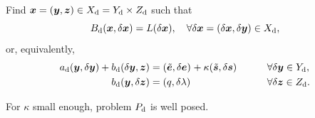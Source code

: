 \begin{problem}[$\Pd$] Find $\xF = (\yF,\zF)\in\XSd = \YSd\times\ZSd$ such that
\begin{equation}
\Bd(\xF,\delta\xF) = L(\delta\xF),\quad\forall\delta\xF = (\delta\xF,\delta\yF)\in\XSd, 
\end{equation} 
or, equivalently,
\begin{alignat}{3}
\ad(\yF,\delta\yF) + \bd(\delta \yF,\zF) & = 
\iprod[]{\eFt}{\delta\eF}+\kappa\iprod[]{\sFt}{\delta\sF}\qquad && \forall \delta \yF\in \YSd,\nonumber\\
\bd(\yF,\delta\zF) & = \iprod[]{q}{\delta\lF} && \forall \delta \zF\in \ZSd.\nonumber
\end{alignat}
\end{problem}

\begin{theorem} \label{thm:thm2}
    For $\kappa$ small enough, problem $\Pd$ is well posed.
\end{theorem}

